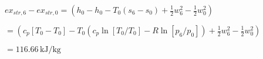 \( ex_{str,6} - ex_{str,0} = \left( h_0 - h_0 - T_0 \left( s_6 - s_0 \right) + \frac{1}{2} w_6^2 - \frac{1}{2} w_0^2 \right) \)  

\( = \left( c_p \left[ T_0 - T_0 \right] - T_0 \left( c_p \ln \left[ T_0 / T_0 \right] - R \ln \left[ p_6 / p_0 \right] \right) + \frac{1}{2} w_6^2 - \frac{1}{2} w_0^2 \right) \)  

\( = 116.66 \, \text{kJ/kg} \)
